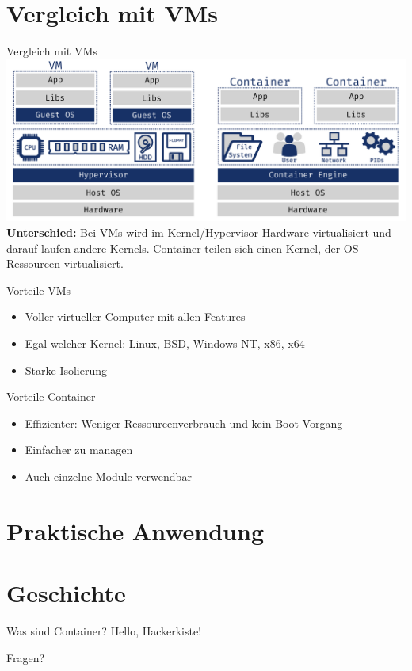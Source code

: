 \documentclass{beamer}
\begin{document}
  \section{Vergleich mit VMs}
  \begin{frame}{Vergleich mit VMs}
    \includegraphics[width=\textwidth]{comparison}
    \textbf{Unterschied:} Bei VMs wird im Kernel/Hypervisor Hardware virtualisiert und darauf laufen andere Kernels. Container teilen sich einen Kernel, der OS-Ressourcen virtualisiert. 
  \end{frame}
  \begin{frame}{Vorteile VMs}
    \begin{itemize}
      \item Voller virtueller Computer mit allen Features
      \item Egal welcher Kernel: Linux, BSD, Windows NT, x86, x64
      \item Starke Isolierung
    \end{itemize}
  \end{frame}
  \begin{frame}{Vorteile Container}
    \begin{itemize}
      \item Effizienter: Weniger Ressourcenverbrauch und kein Boot-Vorgang
      \item Einfacher zu managen
      \item Auch einzelne Module verwendbar
    \end{itemize}
  \end{frame}
  
  \section{Praktische Anwendung}
   
  \section{Geschichte}
  \begin{frame}{Was sind Container?}
    Hello, Hackerkiste!
  \end{frame}


  \begin{frame}[standout]
    Fragen?
  \end{frame}
\end{document}
